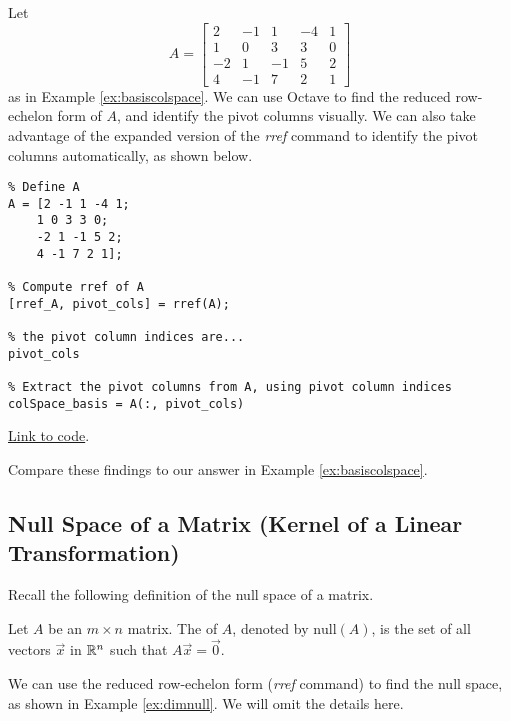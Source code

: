 \documentclass{ximera}
\begin{document}
\begin{template}\label{temp:colSpace}
Let $$A=\begin{bmatrix}2&-1&1&-4&1\\1&0&3&3&0\\-2&1&-1&5&2\\4&-1&7&2&1\end{bmatrix}$$
as in Example \ref{ex:basiscolspace}.  We can use Octave to find the reduced row-echelon form of $A$, and identify the pivot columns visually.  We can also take advantage of the expanded version of the \emph{rref} command to identify the pivot columns automatically, as shown below.

\begin{verbatim}
% Define A
A = [2 -1 1 -4 1;
    1 0 3 3 0;
    -2 1 -1 5 2;
    4 -1 7 2 1];

% Compute rref of A
[rref_A, pivot_cols] = rref(A);

% the pivot column indices are...
pivot_cols

% Extract the pivot columns from A, using pivot column indices
colSpace_basis = A(:, pivot_cols)
\end{verbatim}

\href{https://sagecell.sagemath.org/?z=eJxtTkEKwjAQvAfyh7kULNhiqiIoHoL6Ao9SSq2JBmxTklR8vhssKOjuZWeGmdkEe6VNpyA5k9jiVCATEMgWEBvOQCMww5x2NuKsiLrAEsXILCJcgfiSGM4S7GzbD0HBOaVhdUw_xbuSU_TmYUPV2LsvqTCyE5mOvnBTbx2kD20H011Mozxqp_I85-xjfhsOz-DqJvwYPbSzLahu8Ka7_g3ljPCxrxtVnWtvPH0jJ-vvB9MX3FlRVA==&lang=octave&interacts=eJyLjgUAARUAuQ==}{Link to code}.

Compare these findings to our answer in Example \ref{ex:basiscolspace}.
\end{template}  

\subsection*{Null Space of a Matrix (Kernel of a Linear Transformation)}

Recall the following definition of the null space of a matrix.
\begin{definition}[\ref{def:nullspace}] Let $A$ be an $m\times n$ matrix.  The  of $A$, denoted by $\mbox{null}(A)$, is the set of all vectors $\vec{x}$ in $\mathbb{R}^n$ such that $A\vec{x}=\vec{0}$.
\end{definition}

We can use the reduced row-echelon form (\emph{rref} command) to find the null space, as shown in Example \ref{ex:dimnull}.  We will omit the details here.
\end{document}
